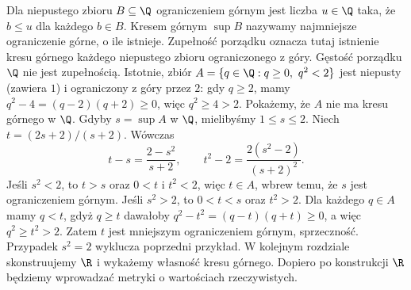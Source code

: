 \begin{uwaga}
\label{ma1:rem:rational-incomplete}
Dla niepustego zbioru $B\subseteq\Q$ ograniczeniem górnym jest liczba $u\in\Q$ taka, że $b\le u$ dla każdego $b\in B$. Kresem górnym $\sup B$ nazywamy najmniejsze ograniczenie górne, o ile istnieje. Zupełność porządku oznacza tutaj istnienie kresu górnego każdego niepustego zbioru ograniczonego z góry. Gęstość porządku $\Q$ nie jest zupełnością. Istotnie, zbiór $A=\{q\in\Q:q\ge0,\ q^2<2\}$ jest niepusty (zawiera $1$) i ograniczony z góry przez $2$: gdy $q\ge2$, mamy $q^2-4=(q-2)(q+2)\ge0$, więc $q^2\ge4>2$. Pokażemy, że $A$ nie ma kresu górnego w $\Q$. Gdyby $s=\sup A$ w $\Q$, mielibyśmy $1\le s\le2$. Niech $t=(2s+2)/(s+2)$. Wówczas
\[
t-s=\frac{2-s^2}{s+2},\qquad t^2-2=\frac{2(s^2-2)}{(s+2)^2}.
\]
Jeśli $s^2<2$, to $t>s$ oraz $0<t$ i $t^2<2$, więc $t\in A$, wbrew temu, że $s$ jest ograniczeniem górnym. Jeśli $s^2>2$, to $0<t<s$ oraz $t^2>2$. Dla każdego $q\in A$ mamy $q<t$, gdyż $q\ge t$ dawałoby $q^2-t^2=(q-t)(q+t)\ge0$, a więc $q^2\ge t^2>2$. Zatem $t$ jest mniejszym ograniczeniem górnym, sprzeczność. Przypadek $s^2=2$ wyklucza poprzedni przykład. W kolejnym rozdziale skonstruujemy $\R$ i wykażemy własność kresu górnego. Dopiero po konstrukcji $\R$ będziemy wprowadzać metryki o wartościach rzeczywistych.
\end{uwaga}

